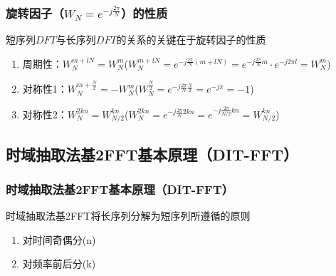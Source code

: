 \documentclass[notheorems,compress,mathserif,table]{beamer}
\newcommand{\sihao}{\fontsize{14pt}{\baselineskip}\selectfont}      %
\newcommand{\xiaosihao}{\fontsize{12pt}{\baselineskip}\selectfont}  %
\begin{document}
\begin{frame}\frametitle{旋转因子（$W_{N}=e^{-j\frac{2\pi}{N}}$）的性质}
\par 短序列$DFT$与长序列$DFT$的关系的关键在于{\heiti 旋转因子}的性质
\newline

\begin{enumerate}
    \item 周期性：$W_{N}^{m+lN}=W_{N}^{m}$\quad($W_{N}^{m+lN}= e^{-j\frac{2\pi}{N}(m+lN)} = e^{-j\frac{2\pi}{N}m}\cdot e^{-j 2\pi l}=W_{N}^{m}$)\newline
    \item 对称性1：$W_{N}^{m+\frac{N}{2}}= -W_{N}^{m}$\quad\quad($W_{N}^{\frac{N}{2}}= e^{-j\frac{2\pi}{N}\frac{N}{2}}= e^{-j\pi}=-1$)\newline
    \item 对称性2：$W_{N}^{2kn}= W_{N/2}^{kn}$\quad\quad($W_{N}^{2kn}= e^{-j\frac{2\pi}{N}2kn}= e^{-j\frac{2\pi}{N/2}kn} =W_{N/2}^{kn} $)
\end{enumerate}
\end{frame}


\subsection{时域抽取法基2FFT基本原理（DIT-FFT）}
\begin{frame}[shrink]\frametitle{时域抽取法基2FFT基本原理（DIT-FFT）}
时域抽取法基2FFT将长序列分解为短序列所遵循的原则
\begin{enumerate}
     \item 对时间奇偶分(n)
     \item 对频率前后分(k)
\end{enumerate}



\end{frame}

\end{document}
